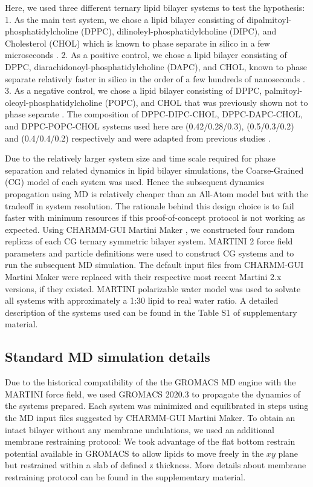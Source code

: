\documentclass{biophys-new}
\begin{document}
Here, we used three different ternary lipid bilayer systems to test the hypothesis:
1. As the main test system, we chose a lipid bilayer consisting of dipalmitoyl-phosphatidylcholine (DPPC), dilinoleyl-phosphatidylcholine
(DIPC), and Cholesterol (CHOL) which is known to phase separate in silico in a few microseconds \cite{Risselada2008,Schafer2010,Janosi2012,Doma2012,Jong2013,Liu2020,Su2020}.
2. As a positive control, we chose a lipid bilayer consisting of DPPC, diarachidonoyl-phosphatidylcholine (DAPC), and CHOL, known to phase separate relatively faster in silico in the order of a few hundreds of nanoseconds \cite{Lin2016,Lin2019,Davis2013a}.
3. As a negative control, we chose a lipid bilayer consisting of DPPC, palmitoyl-oleoyl-phosphatidylcholine (POPC), and CHOL that was previously shown not to
phase separate \cite{Veatch2003,Davis2013a}.
The composition of DPPC-DIPC-CHOL, DPPC-DAPC-CHOL, and DPPC-POPC-CHOL systems used here are (0.42/0.28/0.3),
(0.5/0.3/0.2) and (0.4/0.4/0.2) respectively and were adapted from previous studies \cite{Risselada2008,Lin2016,Davis2013a}.

Due to the relatively larger system size and time scale required for phase separation and related dynamics in lipid bilayer simulations, the Coarse-Grained (CG) model of 
each system was used.
Hence the subsequent dynamics propagation using MD is relatively cheaper than an All-Atom model but with the tradeoff in system resolution.
The rationale behind this design choice is to fail faster with minimum resources if this proof-of-concept protocol is not working as expected. 
Using CHARMM-GUI Martini Maker \cite{Qi2015}, we constructed four random replicas of each CG ternary symmetric bilayer system.
MARTINI 2 force field parameters and particle definitions\cite{Marrink2007,DeJong2013} were used to construct CG systems and to run the subsequent MD simulation. 
The default input files from CHARMM-GUI Martini Maker were replaced with their respective most recent Martini 2.x versions, if they existed.
MARTINI polarizable water model\cite{Yesylevskyy2010} was used to solvate all systems with approximately a 1:30 lipid to real water ratio.
A detailed description of the systems used can be found in the Table S1 of supplementary material.

\subsection*{Standard MD simulation details}

Due to the historical compatibility of the the GROMACS MD engine with the MARTINI force field, we used GROMACS 2020.3\cite{Abraham2015} to propagate the dynamics of the systems prepared. 
Each system was minimized and equilibrated in steps using the MD input files suggested by CHARMM-GUI Martini Maker.
To obtain an intact bilayer without any membrane undulations, we used an additional membrane restraining protocol: 
We took advantage of the flat bottom restrain potential available in GROMACS to allow lipids to move freely in the $xy$ plane but restrained within a slab of
defined z thickness.
More details about membrane restraining protocol can be found in the supplementary material.
\end{document}
